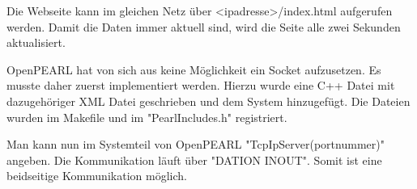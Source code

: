 Die Webseite kann im gleichen Netz über <ipadresse>/index.html aufgerufen werden. Damit die Daten immer aktuell sind, wird die Seite alle zwei Sekunden aktualisiert.

OpenPEARL hat von sich aus keine Möglichkeit ein Socket aufzusetzen. Es musste daher zuerst implementiert werden. Hierzu wurde eine C++ Datei mit dazugehöriger XML Datei geschrieben und dem System hinzugefügt. Die Dateien wurden im Makefile und im "PearlIncludes.h" registriert. 

Man kann nun im Systemteil von OpenPEARL "TcpIpServer(portnummer)" angeben. Die Kommunikation läuft über "DATION INOUT". Somit ist eine beidseitige Kommunikation möglich. 
